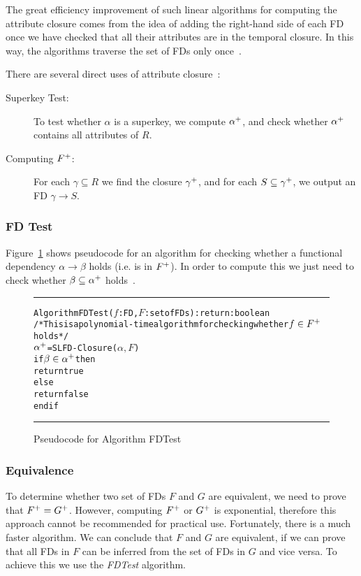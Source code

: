The great efficiency improvement of such linear algorithms for computing the attribute closure
comes from the idea of adding the right-hand side of each FD once we have checked that
all their attributes are in the temporal closure. In
this way, the algorithms traverse the set of FDs
only once~\cite{p10}.

There are several direct uses of attribute closure~\cite[Section 7.4]{bdb4}:
\begin{description}
    \item[Superkey Test:] To test whether $\alpha$ is a superkey, we compute $\alpha\sp{+}$, and check whether $\alpha\sp{+}$ contains all attributes of $R$.
    \item[Computing $F\sp{+}$:] For each $\gamma \subseteq R$ we find the closure $\gamma\sp{+}$, and for each $S \subseteq \gamma\sp{+}$, we output an FD $\gamma \rightarrow S$.
\end{description}

\subsubsection{FD Test}
Figure~\ref{fig:fdtest} shows pseudocode for an algorithm for checking 
whether a functional dependency $\alpha \rightarrow \beta $ 
holds (i.e. is in $F\sp{+}$). In order to compute this we just need to check 
whether $\beta \subseteq \alpha\sp{+}$ holds~\cite[Section 7.4]{bdb4}.
  
\begin{figure}[htbp]
\hrule
\vspace{0.25cm}
\begin{alltt}
Algorithm FDTest(\(f\): FD, \(F\): set of FDs): return: boolean
/*This is a polynomial-time algorithm for checking whether \(f \in F\sp{+}\) holds*/
  \(\alpha\sp{+}\) = SLFD-Closure(\(\alpha, F\))   
  if \(\beta \in \alpha\sp{+}\) then
    return true
  else
    return false
  end if
\end{alltt}
\caption{Pseudocode for Algorithm FDTest}\label{fig:fdtest}
\hrule
\end{figure}

\subsubsection{Equivalence}
To determine whether two set of FDs $F$ and $G$ are equivalent, we need to prove that $F\sp{+} = G\sp{+}$. 
However, computing $F\sp{+}$ or
$G\sp{+}$ is exponential, therefore this approach cannot be recommended for practical use.
Fortunately, there is a much faster algorithm. We can conclude that $F$ and $G$ are
equivalent, if we can prove that all FDs in $F$ can be inferred from the set of FDs in $G$ and vice
versa. To achieve this we use the \textit{FDTest} algorithm.

